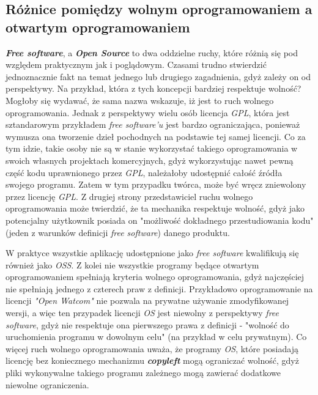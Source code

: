 \documentclass{article}
\begin{document}
\subsection{Różnice pomiędzy wolnym oprogramowaniem a otwartym oprogramowaniem}

\hspace{4mm} \textbf{\emph{Free software}}, a \textbf{\emph{Open Source}} to dwa oddzielne ruchy, które różnią się pod względem praktycznym jak i poglądowym. Czasami trudno stwierdzić jednoznacznie fakt na temat jednego lub drugiego zagadnienia, gdyż zależy on od perspektywy. Na przykład, która z tych koncepcji bardziej respektuje wolność? Mogłoby się wydawać, że sama nazwa wskazuje, iż jest to ruch wolnego oprogramowania. Jednak z perspektywy wielu osób licencja \emph{GPL}, która jest sztandarowym przykładem \emph{free software'u} jest bardzo ograniczająca, ponieważ wymusza ona tworzenie dzieł pochodnych na podstawie tej samej licencji. Co za tym idzie, takie osoby nie są w stanie wykorzystać takiego oprogramowania w swoich własnych projektach komercyjnych, gdyż wykorzystując nawet pewną część kodu uprawnionego przez \emph{GPL}, należałoby udostępnić całość źródła swojego programu. Zatem w tym przypadku twórca, może być wręcz zniewolony przez licencję \emph{GPL}. Z drugiej strony przedstawiciel ruchu wolnego oprogramowania może twierdzić, że ta mechanika respektuje wolność, gdyż jako potencjalny użytkownik posiada on "możliwość dokładnego przestudiowania kodu" (jeden z warunków definicji \emph{free software}) danego produktu.

W praktyce wszystkie aplikację udostępnione jako \emph{free software} kwalifikują się również jako \emph{OSS}. Z kolei nie wszystkie programy będące otwartym oprogramowaniem spełniają kryteria wolnego oprogramowania, gdyż najczęściej nie spełniają jednego z czterech praw z definicji. Przykładowo oprogramowanie na licencji \emph{"Open Watcom"} nie pozwala na prywatne używanie zmodyfikowanej wersji, a więc ten przypadek licencji \emph{OS} jest niewolny z perspektywy \emph{free software}, gdyż nie respektuje ona pierwszego prawa z definicji - "wolność do uruchomienia programu w dowolnym celu" (na przykład w celu prywatnym). Co więcej ruch wolnego oprogramowania uważa, że programy \emph{OS}, które posiadają licencję bez koniecznego mechanizmu \textbf{\emph{copyleft}} mogą ograniczać wolność, gdyż pliki wykonywalne takiego programu zależnego mogą zawierać dodatkowe niewolne ograniczenia\cite{gnu.difference}.
\end{document}
